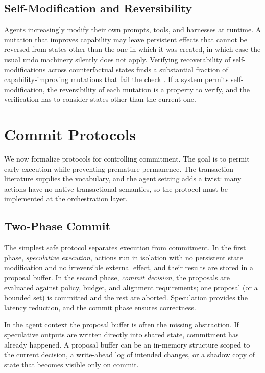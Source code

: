 \documentclass[11pt]{book}
\begin{document}
\subsection{Self-Modification and Reversibility}

Agents increasingly modify their own prompts, tools, and harnesses at runtime. A mutation that improves capability may leave persistent effects that cannot be reversed from states other than the one in which it was created, in which case the usual undo machinery silently does not apply. Verifying recoverability of self-modifications across counterfactual states finds a substantial fraction of capability-improving mutations that fail the check \cite{evoundo2026}. If a system permits self-modification, the reversibility of each mutation is a property to verify, and the verification has to consider states other than the current one.

\section{Commit Protocols}

We now formalize protocols for controlling commitment. The goal is to permit early execution while preventing premature permanence. The transaction literature supplies the vocabulary, and the agent setting adds a twist: many actions have no native transactional semantics, so the protocol must be implemented at the orchestration layer.

\subsection{Two-Phase Commit}

The simplest safe protocol separates execution from commitment. In the first phase, \textit{speculative execution}, actions run in isolation with no persistent state modification and no irreversible external effect, and their results are stored in a proposal buffer. In the second phase, \textit{commit decision}, the proposals are evaluated against policy, budget, and alignment requirements; one proposal (or a bounded set) is committed and the rest are aborted. Speculation provides the latency reduction, and the commit phase ensures correctness.

In the agent context the proposal buffer is often the missing abstraction. If speculative outputs are written directly into shared state, commitment has already happened. A proposal buffer can be an in-memory structure scoped to the current decision, a write-ahead log of intended changes, or a shadow copy of state that becomes visible only on commit.
\end{document}
